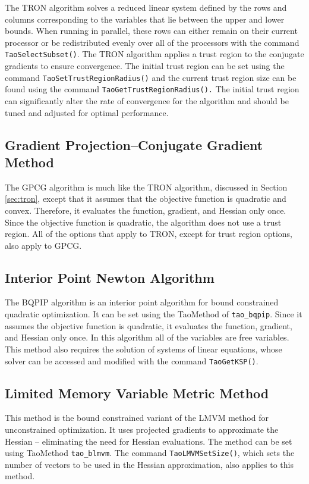 The TRON algorithm solves a reduced linear system
defined by the rows and columns corresponding to the variables that
lie between the upper and lower bounds.
When running in parallel, these rows can either remain on
their current processor or be redistributed evenly over all of the
processors with the command {\tt TaoSelectSubset()}.
The TRON algorithm applies a trust region to the 
conjugate gradients to ensure convergence.  The initial trust region
can be set using the command 
{\tt TaoSetTrustRegionRadius()}
and the current trust region size can be found using the command
{\tt TaoGetTrustRegionRadius().}
The initial trust region can significantly alter the 
rate of convergence for the algorithm and should be
tuned and adjusted for optimal performance.


\subsection{Gradient Projection--Conjugate Gradient Method}
The GPCG \cite{more-toraldo} algorithm is much like the TRON algorithm, discussed in
Section \ref{sec:tron}, except that
it assumes that the objective function is quadratic and convex.
Therefore, it evaluates the function, gradient, and Hessian only
once.
Since the objective function
is quadratic, the algorithm does not use a trust region.  
All of the options that apply to TRON, except for trust region
options,  also apply to GPCG.

\subsection{Interior Point Newton Algorithm}
The BQPIP algorithm is an interior point algorithm for bound
constrained quadratic optimization.  It can be set using the
TaoMethod of {\tt tao\_bqpip}.
Since it assumes the objective function is quadratic, 
it evaluates the function, gradient, and Hessian only once.
In this algorithm all of the variables are free variables.
This method also requires the solution of systems of linear equations,
whose solver can be accessed and modified 
with the command {\tt TaoGetKSP()}.

\subsection{Limited Memory Variable Metric Method}

This method is the bound constrained variant of the LMVM method for
unconstrained optimization.  It uses projected gradients to approximate
the Hessian -- eliminating the need for Hessian evaluations.
The method can be set using  TaoMethod {\tt tao\_blmvm}.
The command {\tt TaoLMVMSetSize()}, which sets the number
of vectors to be used in the Hessian approximation, 
also applies to this method.

